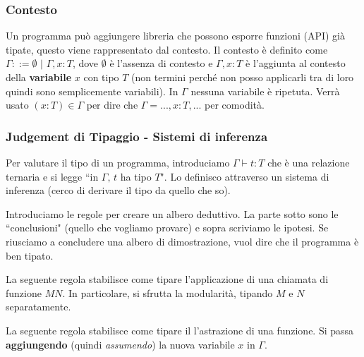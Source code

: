 \documentclass{article}
\begin{document}
\subsubsection{Contesto}

Un programma può aggiungere libreria che possono esporre funzioni (API) già tipate, questo viene rappresentato dal contesto. Il {\color{red}contesto} è definito come $\Gamma ::= \emptyset\,\, |\,\, \Gamma, x:T$, dove $\emptyset$ è l'assenza di contesto e $\Gamma, x:T$ è l'aggiunta al contesto della \textbf{variabile} $x$ con tipo $T$ (non termini perché non posso applicarli tra di loro quindi sono semplicemente variabili). In $\Gamma$ nessuna variabile è ripetuta. Verrà usato $(x:T)\in\Gamma$ per dire che $\Gamma = ..., x:T,...$ per comodità.

\subsubsection{Judgement di Tipaggio - Sistemi di inferenza}
Per valutare il tipo di un programma, introduciamo $\Gamma \vdash t:T$ che è una relazione ternaria e si legge ``in $\Gamma,\,t$ ha tipo $T$". Lo definisco attraverso un sistema di inferenza (cerco di derivare il tipo da quello che so).

\bigskip

Introduciamo le regole per creare un albero deduttivo. La parte sotto sono le ``conclusioni" (quello che vogliamo provare) e sopra scriviamo le ipotesi. Se riusciamo a concludere una albero di dimostrazione, vuol dire che il programma è ben tipato.

\bigskip


\bigskip

La seguente regola stabilisce come tipare l'applicazione di una chiamata di funzione $MN$. In particolare, si sfrutta la modularità, tipando $M$ e $N$ separatamente.

\bigskip


\bigskip

La seguente regola stabilisce come tipare il l'astrazione di una funzione. Si passa \textbf{aggiungendo} (quindi \textit{assumendo}) la nuova variabile $x$ in $\Gamma$.

\bigskip

\end{document}
